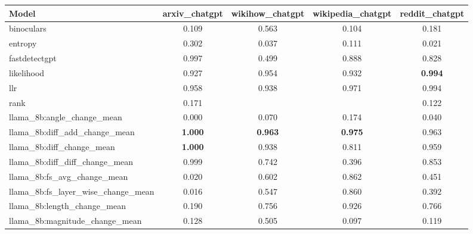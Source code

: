 \begin{tabular}{lcccc}
\toprule
Model & arxiv\_chatgpt & wikihow\_chatgpt & wikipedia\_chatgpt & reddit\_chatgpt \\
\midrule
binoculars & 0.109 & 0.563 & 0.104 & 0.181 \\
entropy & 0.302 & 0.037 & 0.111 & 0.021 \\
fastdetectgpt & 0.997 & 0.499 & 0.888 & 0.828 \\
likelihood & 0.927 & 0.954 & 0.932 & \textbf{0.994} \\
llr & 0.958 & 0.938 & 0.971 & 0.994 \\
rank & 0.171 &  &  & 0.122 \\
\midrule
llama\_8b:angle\_change\_mean & 0.000 & 0.070 & 0.174 & 0.040 \\
llama\_8b:diff\_add\_change\_mean & \textbf{1.000} & \textbf{0.963} & \textbf{0.975} & 0.963 \\
llama\_8b:diff\_change\_mean & \textbf{1.000} & 0.938 & 0.811 & 0.959 \\
llama\_8b:diff\_diff\_change\_mean & 0.999 & 0.742 & 0.396 & 0.853 \\
llama\_8b:fs\_avg\_change\_mean & 0.020 & 0.602 & 0.862 & 0.451 \\
llama\_8b:fs\_layer\_wise\_change\_mean & 0.016 & 0.547 & 0.860 & 0.392 \\
llama\_8b:length\_change\_mean & 0.190 & 0.756 & 0.926 & 0.766 \\
llama\_8b:magnitude\_change\_mean & 0.128 & 0.505 & 0.097 & 0.119 \\
\bottomrule
\end{tabular}
